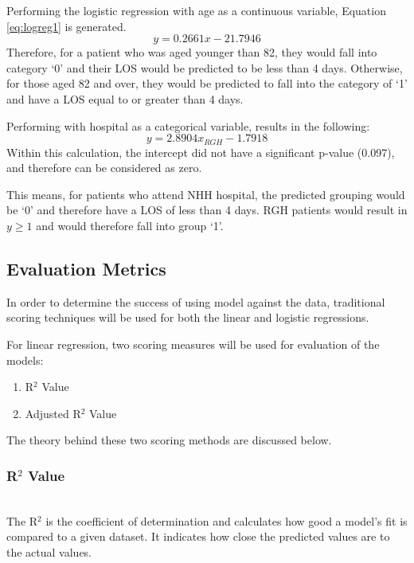 \documentclass[../thesis.tex]{subfiles}
\begin{document}
Performing the logistic regression with age as a continuous variable, Equation \eqref{eq:logreg1} is generated.
\begin{equation}\label{eq:logreg1}
y = 0.2661x-21.7946
\end{equation}
Therefore, for a patient who was aged younger than 82, they would fall into category `0' and their LOS would be predicted to be less than 4 days. Otherwise, for those aged 82 and over, they would be predicted to fall into the category of `1' and have a LOS equal to or greater than 4 days.

Performing with hospital as a categorical variable, results in the following:
\begin{equation}\label{eq:logreg2}
y = 2.8904x_{RGH} -1.7918 
\end{equation}
Within this calculation, the intercept did not have a significant p-value (0.097), and therefore can be considered as zero.

This means, for patients who attend NHH hospital, the predicted grouping would be `0' and therefore have a LOS of less than 4 days. RGH patients would result in $y \geq 1$ and would therefore fall into group `1'.


\subsection{Evaluation Metrics}
In order to determine the success of using model against the data, traditional scoring techniques will be used for both the linear and logistic regressions.

For linear regression, two scoring measures will be used for evaluation of the models:

\begin{enumerate}
    \item R$^{2}$ Value
    \item Adjusted R$^{2}$ Value
\end{enumerate}

The theory behind these two scoring methods are discussed below.

\subsubsection{R$^{2}$ Value}\\
 The R$^{2}$ is the coefficient of determination and calculates how good a model's fit is compared to a given dataset. It indicates how close the predicted values are to the actual values.
\end{document}
